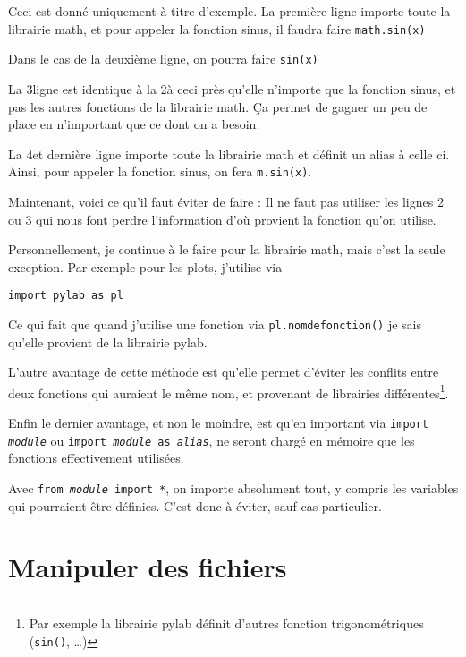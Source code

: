 \documentclass[a4paper,twoside]{article}
\begin{document}
Ceci est donné uniquement à titre d'exemple. La première ligne importe toute la librairie math, et pour appeler la fonction sinus, il faudra faire \texttt{math.sin(x)}

Dans le cas de la deuxième ligne, on pourra faire  \texttt{sin(x)}

La 3\ieme ligne est identique à la 2\ieme à ceci près qu'elle n'importe que la fonction sinus, et pas les autres fonctions de la librairie math. Ça permet de gagner un peu de place en n'important que ce dont on a besoin.

La 4\ieme et dernière ligne importe toute la librairie math et définit un alias à celle ci. Ainsi, pour appeler la fonction sinus, on fera \texttt{m.sin(x)}.

\bigskip

Maintenant, voici ce qu'il faut éviter de faire : Il ne faut pas utiliser les lignes 2 ou 3 qui nous font perdre l'information d'où provient la fonction qu'on utilise.

Personnellement, je continue à le faire pour la librairie math, mais c'est la seule exception. Par exemple pour les plots, j'utilise  via
\begin{verbatim}
import pylab as pl
\end{verbatim}
Ce qui fait que quand j'utilise une fonction via \texttt{pl.nomdefonction()} je sais qu'elle provient de la librairie pylab.

L'autre avantage de cette méthode est qu'elle permet d'éviter les conflits entre deux fonctions qui auraient le même nom, et provenant de librairies différentes\footnote{Par exemple la librairie pylab définit d'autres fonction trigonométriques (\texttt{sin()}, \dots)}.

Enfin le dernier avantage, et non le moindre, est qu'en important via \texttt{import \emph{module}} ou \texttt{import \emph{module} as \emph{alias}}, ne seront chargé en mémoire que les fonctions effectivement utilisées.

\begin{attention}
Avec \texttt{from \emph{module} import *}, on importe absolument tout, y compris les variables qui pourraient être définies. C'est donc à éviter, sauf cas particulier.
\end{attention}





\section{Manipuler des fichiers}
\end{document}
